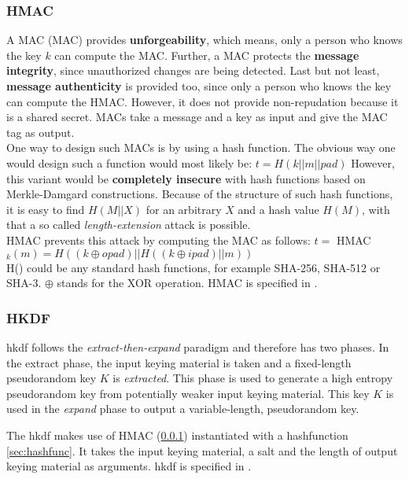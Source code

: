 \subsubsection{HMAC}
\label{sec:hmac}
A \acl{MAC} (\ac{MAC}) provides \textbf{unforgeability}, which means, only a person who knows the key $k$ can compute the MAC.
Further, a MAC protects the \textbf{message integrity}, since unauthorized changes are being detected.
Last but not least, \textbf{message authenticity} is provided too, since only a person who knows the key can compute the HMAC.
However, it does not provide non-repudation because it is a shared secret.
MACs take a message and a key as input and give the MAC tag as output.
\\One way to design such MACs is by using a hash function.
The obvious way one would design such a function would most likely be: $ t = H(k || m || pad)$
However, this variant would be \textbf{completely insecure} with hash functions based on Merkle-Damgard constructions.
Because of the structure of such hash functions, it is easy to find $H(M || X)$ for an arbitrary $X$ and a hash value $H(M)$, with that a so called \textit{length-extension} attack is possible.
\\HMAC prevents this attack by computing the MAC as follows: $t = $ HMAC$_k(m) = H( (k \oplus opad) || H( (k \oplus ipad) || m) ) $
\\ H() could be any standard hash functions, for example SHA-256, SHA-512 or SHA-3.
$\oplus$ stands for the XOR operation.
HMAC is specified in \cite{rfc2104}.

\subsubsection{HKDF}
\gls{hkdf} follows the \textit{extract-then-expand} paradigm and therefore has two phases.
In the extract phase, the input keying material is taken and a fixed-length pseudorandom key $K$ is \textit{extracted}.
This phase is used to generate a high entropy pseudorandom key from potentially weaker input keying material.
This key $K$ is used in the \textit{expand} phase to output a variable-length, pseudorandom key.

The \gls{hkdf} makes use of HMAC (\ref{sec:hmac}) instantiated with a hashfunction \ref{sec:hashfunc}.
It takes the input keying material, a salt and the length of output keying material as arguments.
\gls{hkdf} is specified in \cite{rfc5869}.


